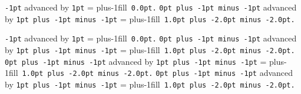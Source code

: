 % 
% 
% 
% 
% 

\def\signed #1{{\nobreak\hfil\penalty50\hfilneg\hskip0pt plus-1fill\hbox{}\nobreak\hfill\ #1}}
{\tt -1pt} advanced by {\tt 1pt} =\signed {\tt 0.0pt.}
{\tt 0pt plus -1pt minus -1pt} advanced by {\tt 1pt plus -1pt minus -1pt} =\signed {\tt 1.0pt plus -2.0pt minus -2.0pt.}

{\tt -1pt} advanced by {\tt 1pt} =\hskip0pt plus-1fill\hbox{}\nobreak\hfill\ {\tt 0.0pt.}
{\tt 0pt plus -1pt minus -1pt} advanced by {\tt 1pt plus -1pt minus -1pt} =\hskip0pt plus-1fill\hbox{}\nobreak\hfill\ {\tt 1.0pt plus -2.0pt minus -2.0pt.}
{\tt 0pt plus -1pt minus -1pt} advanced by {\tt 1pt plus -1pt minus -1pt} =\nobreak\hskip0pt plus-1fill\hbox{}\nobreak\hfill\ {\tt 1.0pt plus -2.0pt minus -2.0pt.}
{\tt 0pt plus -1pt minus -1pt} advanced by {\tt 1pt plus -1pt minus -1pt} =\hfil{}\hfilneg\hskip0pt plus-1fill\hbox{}\nobreak\hfill\ {\tt 1.0pt plus -2.0pt minus -2.0pt.}
\showlists
\bye

